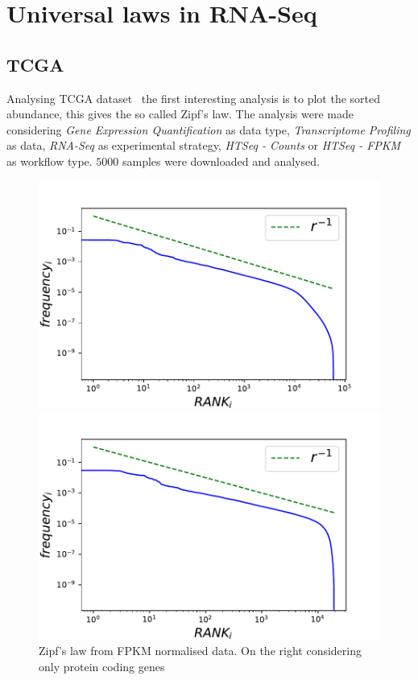 \section{Universal laws in RNA-Seq}
\subsection{TCGA}
Analysing TCGA dataset~\cite{grossman2016toward} the first interesting analysis is to plot the sorted abundance, this gives the so called Zipf's law. The analysis were made considering \textit{Gene Expression Quantification} as data type, \textit{Transcriptome Profiling} as data, \textit{RNA-Seq} as experimental strategy, \textit{HTSeq - Counts} or \textit{HTSeq - FPKM} as workflow type. $5000$ samples were downloaded and analysed.
\begin{figure}[htb!]
    \centering
    \begin{minipage}{0.45\textwidth}
    \includegraphics[width=0.95\linewidth]{pictures/structure/tcga/globalzipf_fpkmall.pdf}
    \end{minipage}
\hspace{3mm}
    \begin{minipage}{0.45\textwidth}
    \includegraphics[width=0.95\linewidth]{pictures/structure/tcga/globalzipf_fpkm.pdf}
    \end{minipage}
    \caption{Zipf's law from FPKM normalised data. On the right considering only protein coding genes}
    \label{fig:structure/tcga/globalZipf}
\end{figure}

